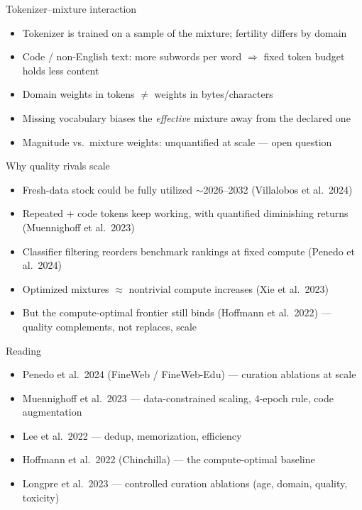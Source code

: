 \documentclass[aspectratio=169,11pt]{beamer}
\begin{document}
\begin{frame}{Tokenizer--mixture interaction}
\begin{itemize}
\item Tokenizer is trained on a sample of the mixture; fertility differs by domain
\item Code / non-English text: more subwords per word $\Rightarrow$ fixed token budget holds less content
\item Domain weights in tokens $\neq$ weights in bytes/characters
\item Missing vocabulary biases the \emph{effective} mixture away from the declared one
\item Magnitude vs.\ mixture weights: unquantified at scale --- open question
\end{itemize}
\end{frame}

\begin{frame}{Why quality rivals scale}
\begin{itemize}
\item Fresh-data stock could be fully utilized $\sim$2026--2032 (Villalobos et al.\ 2024)
\item Repeated + code tokens keep working, with quantified diminishing returns (Muennighoff et al.\ 2023)
\item Classifier filtering reorders benchmark rankings at fixed compute (Penedo et al.\ 2024)
\item Optimized mixtures $\approx$ nontrivial compute increases (Xie et al.\ 2023)
\item But the compute-optimal frontier still binds (Hoffmann et al.\ 2022) --- quality complements, not replaces, scale
\end{itemize}
\end{frame}

\begin{frame}{Reading}
\begin{itemize}
\item Penedo et al.\ 2024 (FineWeb / FineWeb-Edu) --- curation ablations at scale
\item Muennighoff et al.\ 2023 --- data-constrained scaling, 4-epoch rule, code augmentation
\item Lee et al.\ 2022 --- dedup, memorization, efficiency
\item Hoffmann et al.\ 2022 (Chinchilla) --- the compute-optimal baseline
\item Longpre et al.\ 2023 --- controlled curation ablations (age, domain, quality, toxicity)
\end{itemize}
\end{frame}
\end{document}

